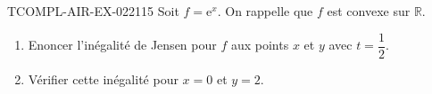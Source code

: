 \begin{exercice}{TCOMPL-AIR-EX-022}{1}{15}
Soit $f = \mathrm{e}^x$. On rappelle que $f$ est convexe sur $\mathbb{R}$.
\begin{enumerate}
  \item Enoncer l'inégalité de Jensen pour $f$ aux points $x$ et $y$ avec $t = \dfrac{1}{2}$.
  \item Vérifier cette inégalité pour $x = 0$ et $y = 2$.
\end{enumerate}

\end{exercice}
